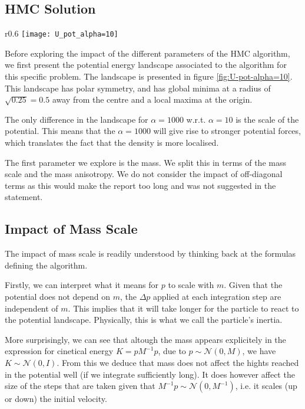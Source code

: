 \documentclass[a4paper, 12pt,oneside]{article}
\begin{document}
		\subsection{HMC Solution}
			\begin{wrapfigure}[18]{r}{0.6\textwidth}
				\centering
					\vspace{-2em}
					\texttt{[image: U\_pot\_alpha=10]}
					\caption{Potential energy landscape associated to HMC algorithm for $\alpha=10$. Version for $\alpha=1000$ is identical, except the vertical scale is multiplied by a factor 100.}
					\label{fig:U-pot-alpha=10}
			\end{wrapfigure}
			Before exploring the impact of the different parameters of the HMC algorithm, we first present the potential energy landscape associated to the algorithm for this specific problem. The landscape is presented in figure \ref{fig:U-pot-alpha=10}. 
			This landscape has polar symmetry, and has global minima at a radius of $\sqrt{0.25}=0.5$ away from the centre and a local maxima at the origin. 

			The only difference in the landscape for $\alpha=1000$ w.r.t. $\alpha=10$ is the scale of the potential. This means that the $\alpha=1000$ will give rise to stronger potential forces, which translates the fact that the density is more localised. 

			The first parameter we explore is the mass. We split this in terms of the mass scale and the mass anisotropy. We do not consider the impact of off-diagonal terms as this would make the report too long and was not suggested in the statement.
			\subsection{Impact of Mass Scale}
			The impact of mass scale is readily understood by thinking back at the formulas defining the algorithm.		
			
			Firstly, we can interpret what it means for $p$ to scale with $m$. Given that the potential does not depend on $m$, the $\Delta p$ applied at each integration step are independent of $m$. This implies that it will take longer for the particle to react to the potential landscape. Physically, this is what we call the particle's inertia.

			More surprisingly, we can see that altough the mass appears explicitely in the expression for cinetical energy $K=pM^{-1}p$, due to $p\sim\mathcal{N}(0,M)$, we have $K\sim\mathcal{N}(0,I)$. From this we deduce that mass does not affect the hights reached in the potential well (if we integrate sufficiently long). 
			It does however affect the size of the steps that are taken given that $M^{-1}p\sim\mathcal{N}(0,M^{-1})$, i.e. it scales (up or down) the initial velocity. 
\end{document}
